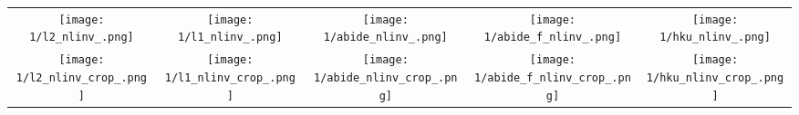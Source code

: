 \begin{tabular}{c @{\hskip 0pt} c @{\hskip 0pt} c @{\hskip 0pt} c @{\hskip 0pt} c}
    \texttt{[image: 1/l2\_nlinv\_.png]}&
    \texttt{[image: 1/l1\_nlinv\_.png]}&
    \texttt{[image: 1/abide\_nlinv\_.png]}&
    \texttt{[image: 1/abide\_f\_nlinv\_.png]}&
    \texttt{[image: 1/hku\_nlinv\_.png]}\\
    \texttt{[image: 1/l2\_nlinv\_crop\_.png]}&
    \texttt{[image: 1/l1\_nlinv\_crop\_.png]}&
    \texttt{[image: 1/abide\_nlinv\_crop\_.png]}&
    \texttt{[image: 1/abide\_f\_nlinv\_crop\_.png]}&
    \texttt{[image: 1/hku\_nlinv\_crop\_.png]}
\end{tabular}

